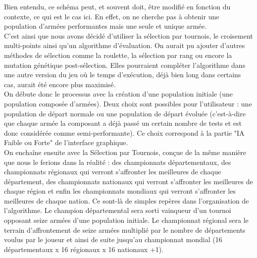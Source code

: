 \documentclass[a4paper]{article} %
\begin{document}
Bien entendu, ce schéma peut, et souvent doit, être modifié en fonction du contexte, ce qui est le cas ici. En effet, on ne cherche pas à obtenir une population d'armées performantes mais une seule et unique armée.\\

C'est ainsi que nous avons décidé d'utiliser la sélection par tournois, le croisement multi-points ainsi qu'un algorithme d'évaluation. On aurait pu ajouter d'autres méthodes de sélection comme la roulette, la sélection par rang ou encore la mutation génétique post-sélection. Elles pourraient compléter l'algorithme dans une autre version du jeu où le temps d'exécution, déjà bien long dans certains cas, aurait été encore plus maximisé.\\

\label{OptiFaibleFort}On débute donc le processus avec la création d'une population initiale (une population composée d'armées). Deux choix sont possibles pour l'utilisateur : une population de départ normale ou une population de départ évoluée (c'est-à-dire que chaque armée la composant a déjà passé un certain nombre de tests et est donc considérée comme semi-performante). Ce choix correspond à la partie "IA Faible ou Forte" de l'interface graphique.\\

On enchaîne ensuite avec la Sélection par Tournois, conçue de la même manière que nous le ferions dans la réalité : des championnats départementaux, des championnats régionaux qui verront s'affronter les meilleures de chaque département, des championnats nationaux qui verront s'affronter les meilleures de chaque région et enfin les championnats mondiaux qui verront s'affronter les meilleures de chaque nation. Ce sont-là de simples repères dans l'organisation de l'algorithme.
Le champion départemental sera sorti vainqueur d'un tournoi opposant seize armées d'une population initiale. Le championnat régional sera le terrain d'affrontement de seize armées multiplié par le nombre de départements voulus par le joueur et ainsi de suite jusqu'au championnat mondial (16 départementaux x 16 régionaux x 16 nationaux +1).\\
\end{document}

